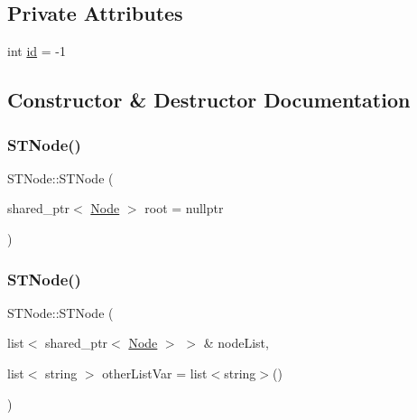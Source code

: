 \subsection*{Private Attributes}
\begin{DoxyCompactItemize}
\item 
int \hyperlink{class_s_t_node_ad8a92733e77010b8aaac8ab0f82405f1}{id} = -\/1
\end{DoxyCompactItemize}


\subsection{Constructor \& Destructor Documentation}
\mbox{\label{class_s_t_node_adcdfca666c892461693ac42920fbc0df}} 
\subsubsection{\texorpdfstring{S\+T\+Node()}{STNode()}\hspace{0.1cm}{\footnotesize\ttfamily [1/2]}}
{\footnotesize\ttfamily S\+T\+Node\+::\+S\+T\+Node (\begin{DoxyParamCaption}\item[{shared\+\_\+ptr$<$ \hyperlink{class_node}{Node} $>$}]{root = {\ttfamily nullptr} }\end{DoxyParamCaption})\hspace{0.3cm}{\ttfamily [explicit]}}

\mbox{\label{class_s_t_node_abc48151a02b70b445ef9c4e5066c1fe8}} 
\subsubsection{\texorpdfstring{S\+T\+Node()}{STNode()}\hspace{0.1cm}{\footnotesize\ttfamily [2/2]}}
{\footnotesize\ttfamily S\+T\+Node\+::\+S\+T\+Node (\begin{DoxyParamCaption}\item[{list$<$ shared\+\_\+ptr$<$ \hyperlink{class_node}{Node} $>$ $>$ \&}]{node\+List,  }\item[{list$<$ string $>$}]{other\+List\+Var = {\ttfamily list$<$string$>$()} }\end{DoxyParamCaption})\hspace{0.3cm}{\ttfamily [explicit]}}

